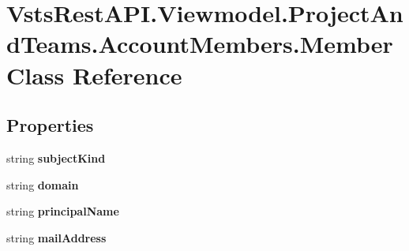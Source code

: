 \hypertarget{class_vsts_rest_a_p_i_1_1_viewmodel_1_1_project_and_teams_1_1_account_members_1_1_member}{}\section{Vsts\+Rest\+A\+P\+I.\+Viewmodel.\+Project\+And\+Teams.\+Account\+Members.\+Member Class Reference}
\label{class_vsts_rest_a_p_i_1_1_viewmodel_1_1_project_and_teams_1_1_account_members_1_1_member}
\subsection*{Properties}
\begin{DoxyCompactItemize}
\item 
\mbox{\label{class_vsts_rest_a_p_i_1_1_viewmodel_1_1_project_and_teams_1_1_account_members_1_1_member_ae76e6dfacc3509d9c8653377aea861af}} 
string {\bfseries subject\+Kind}
\item 
\mbox{\label{class_vsts_rest_a_p_i_1_1_viewmodel_1_1_project_and_teams_1_1_account_members_1_1_member_a4b482a850be57ec5b3b13b0ea1cb8e3e}} 
string {\bfseries domain}
\item 
\mbox{\label{class_vsts_rest_a_p_i_1_1_viewmodel_1_1_project_and_teams_1_1_account_members_1_1_member_aba6d9ef18e4fcfb5fcafd63f345214e7}} 
string {\bfseries principal\+Name}
\item 
\mbox{\label{class_vsts_rest_a_p_i_1_1_viewmodel_1_1_project_and_teams_1_1_account_members_1_1_member_ab0e96f12cb4c03107bf137e87cec0bf2}} 
string {\bfseries mail\+Address}

\end{DoxyCompactItemize}
